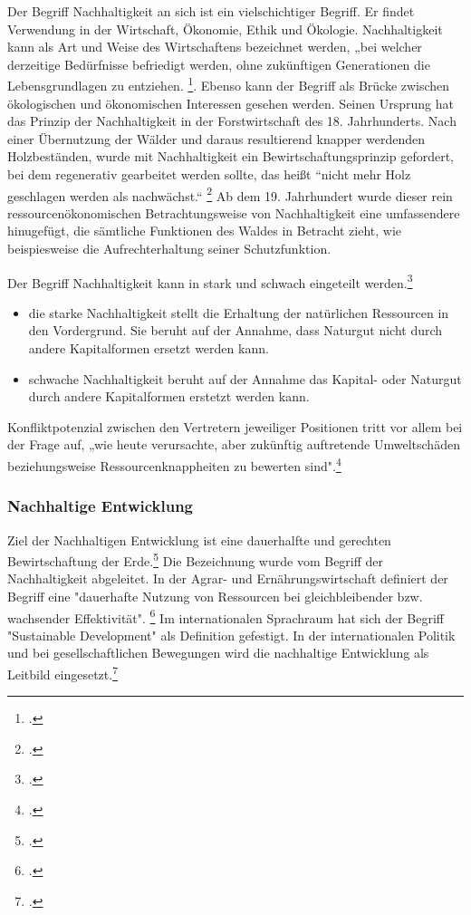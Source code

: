 \documentclass{scrartcl}
\begin{document}
Der Begriff Nachhaltigkeit an sich ist ein vielschichtiger Begriff. Er findet Verwendung in der Wirtschaft, Ökonomie, Ethik und Ökologie. Nachhaltigkeit kann als Art und Weise des Wirtschaftens bezeichnet werden, „bei welcher derzeitige Bedürfnisse befriedigt werden, ohne zukünftigen Generationen die Lebensgrundlagen zu entziehen. \footcite{DefinitionWirtschaftslexikonb}. Ebenso kann der Begriff als Brücke zwischen ökologischen und ökonomischen Interessen gesehen werden. Seinen Ursprung hat das Prinzip der Nachhaltigkeit in der Forstwirtschaft des 18. Jahrhunderts. Nach einer Übernutzung der Wälder und daraus resultierend knapper werdenden Holzbeständen, wurde mit Nachhaltigkeit ein Bewirtschaftungsprinzip gefordert, bei dem regenerativ gearbeitet werden sollte, das heißt “nicht mehr Holz geschlagen werden als nachwächst.“ \footcite{NachhaltigeBrockhaus.de}
Ab dem 19. Jahrhundert wurde dieser rein ressourcenökonomischen Betrachtungsweise von Nachhaltigkeit eine umfassendere hinugefügt, die sämtliche Funktionen des Waldes in Betracht zieht, wie beispiesweise die Aufrechterhaltung seiner Schutzfunktion.

\hfill \break
Der Begriff Nachhaltigkeit kann in stark und schwach eingeteilt werden.\footcite{Nachhaltigkeit}


\begin{itemize}
\item die starke Nachhaltigkeit stellt die Erhaltung der natürlichen Ressourcen in den Vordergrund. Sie beruht auf der Annahme, dass Naturgut nicht durch andere Kapitalformen ersetzt werden kann.
\item schwache Nachhaltigkeit beruht auf der Annahme das Kapital- oder Naturgut durch andere Kapitalformen erstetzt werden kann.
\end{itemize}
Konfliktpotenzial zwischen den Vertretern jeweiliger Positionen tritt vor allem bei der Frage auf, „wie heute verursachte, aber zukünftig auftretende Umweltschäden beziehungsweise Ressourcenknappheiten zu bewerten sind".\footcite{NachhaltigeBrockhaus.de}



\subsubsection{Nachhaltige Entwicklung}
  Ziel der Nachhaltigen Entwicklung ist eine dauerhalfte und gerechten Bewirtschaftung der Erde.\footcite{NachhaltigeBrockhaus.de} Die Bezeichnung wurde vom Begriff der Nachhaltigkeit abgeleitet. In der Agrar- und Ernährungswirtschaft definiert der Begriff eine "dauerhafte Nutzung von Ressourcen bei gleichbleibender bzw. wachsender Effektivität". \footcite{oppenhauser2010nachhaltigkeit} Im internationalen Sprachraum hat sich der Begriff "Sustainable Development" als Definition gefestigt. In der internationalen Politik und bei gesellschaftlichen Bewegungen wird die nachhaltige Entwicklung als Leitbild eingesetzt.\footcite{oppenhauser2010nachhaltigkeit}
 
\end{document}
